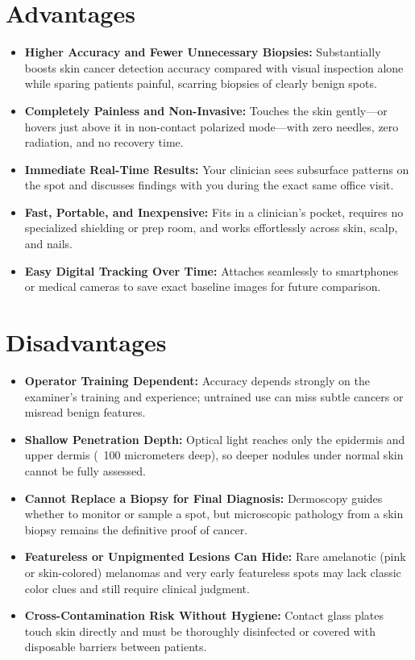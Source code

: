 \section{Advantages}
\begin{itemize}
\item \textbf{Higher Accuracy and Fewer Unnecessary Biopsies:} Substantially boosts skin cancer detection accuracy compared with visual inspection alone while sparing patients painful, scarring biopsies of clearly benign spots.
\item \textbf{Completely Painless and Non-Invasive:} Touches the skin gently---or hovers just above it in non-contact polarized mode---with zero needles, zero radiation, and no recovery time.
\item \textbf{Immediate Real-Time Results:} Your clinician sees subsurface patterns on the spot and discusses findings with you during the exact same office visit.
\item \textbf{Fast, Portable, and Inexpensive:} Fits in a clinician's pocket, requires no specialized shielding or prep room, and works effortlessly across skin, scalp, and nails.
\item \textbf{Easy Digital Tracking Over Time:} Attaches seamlessly to smartphones or medical cameras to save exact baseline images for future comparison.
\end{itemize}

\section{Disadvantages}
\begin{itemize}
\item \textbf{Operator Training Dependent:} Accuracy depends strongly on the examiner's training and experience; untrained use can miss subtle cancers or misread benign features.
\item \textbf{Shallow Penetration Depth:} Optical light reaches only the epidermis and upper dermis (~100 micrometers deep), so deeper nodules under normal skin cannot be fully assessed.
\item \textbf{Cannot Replace a Biopsy for Final Diagnosis:} Dermoscopy guides whether to monitor or sample a spot, but microscopic pathology from a skin biopsy remains the definitive proof of cancer.
\item \textbf{Featureless or Unpigmented Lesions Can Hide:} Rare amelanotic (pink or skin-colored) melanomas and very early featureless spots may lack classic color clues and still require clinical judgment.
\item \textbf{Cross-Contamination Risk Without Hygiene:} Contact glass plates touch skin directly and must be thoroughly disinfected or covered with disposable barriers between patients.
\end{itemize}


